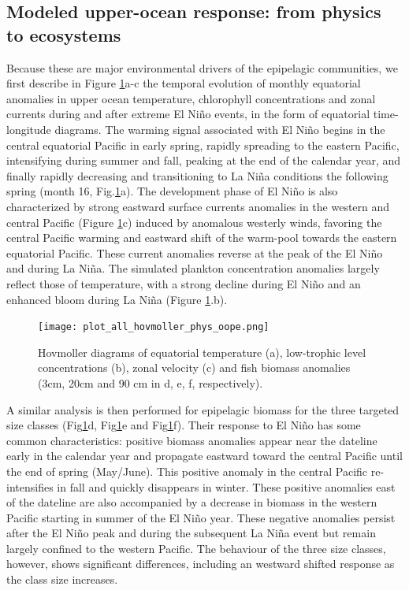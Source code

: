 \subsection{Modeled upper-ocean response: from physics to ecosystems}

Because these are major environmental drivers of the epipelagic communities, we first describe in Figure \ref{fig:hov_nemo_ape}a-c the temporal evolution of monthly equatorial anomalies in upper ocean temperature, chlorophyll concentrations and zonal currents during and after extreme El Niño events, in the form of equatorial time-longitude diagrams. The warming signal associated with El Niño begins in the central equatorial Pacific in early spring, rapidly spreading to the eastern Pacific, intensifying during summer and fall, peaking at the end of the calendar year, and finally rapidly decreasing and transitioning to La Niña conditions the following spring (month 16, Fig.\ref{fig:hov_nemo_ape}a). The development phase of El Niño is also characterized by strong  eastward surface currents anomalies in the western and central Pacific (Figure \ref{fig:hov_nemo_ape}c) induced by anomalous westerly winds, favoring the central Pacific warming and eastward shift of the warm-pool towards the eastern equatorial Pacific. These current anomalies reverse at the peak of the El Niño and during La Niña. The simulated plankton concentration anomalies largely reflect those of temperature, with a strong decline during El Niño and an enhanced bloom during La Niña (Figure \ref{fig:hov_nemo_ape}.b). 


\begin{figure}[h!tp]
	\centering
	\texttt{[image: plot\_all\_hovmoller\_phys\_oope.png]}	
	\caption{Hovmoller diagrams of equatorial temperature (a), low-trophic level concentrations (b), zonal velocity (c) and fish biomass anomalies (3cm, 20cm and 90 cm in d, e, f, respectively).}	
	\label{fig:hov_nemo_ape}
\end{figure}

A similar analysis is then performed for epipelagic biomass for the three targeted size classes (Fig\ref{fig:hov_nemo_ape}d, Fig\ref{fig:hov_nemo_ape}e and Fig\ref{fig:hov_nemo_ape}f). Their response to El Niño has some common characteristics: positive biomass anomalies appear near the dateline early in the calendar year and propagate eastward toward the central Pacific until the end of spring (May/June). This positive anomaly in the central Pacific re-intensifies in fall and quickly disappears in winter. These positive anomalies east of the dateline are also accompanied by a decrease in biomass in the western Pacific starting in summer of the El Niño year. These negative anomalies persist after the El Niño peak and during the subsequent La Niña event but remain largely confined to the western Pacific. The behaviour of the three size classes, however,  shows significant differences, including an westward shifted response as the class size increases.

